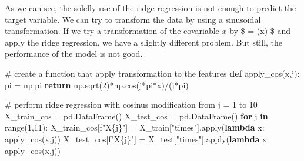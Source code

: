 \documentclass[
  letterpaper,
  DIV=11,
  numbers=noendperiod]{scrartcl}
\newenvironment{Shaded}{\begin{snugshade}}{\end{snugshade}}
\newcommand{\BuiltInTok}[1]{\textcolor[rgb]{0.00,0.23,0.31}{#1}}
\newcommand{\CommentTok}[1]{\textcolor[rgb]{0.37,0.37,0.37}{#1}}
\newcommand{\ControlFlowTok}[1]{\textcolor[rgb]{0.00,0.23,0.31}{\textbf{#1}}}
\newcommand{\DecValTok}[1]{\textcolor[rgb]{0.68,0.00,0.00}{#1}}
\newcommand{\KeywordTok}[1]{\textcolor[rgb]{0.00,0.23,0.31}{\textbf{#1}}}
\newcommand{\NormalTok}[1]{\textcolor[rgb]{0.00,0.23,0.31}{#1}}
\newcommand{\OperatorTok}[1]{\textcolor[rgb]{0.37,0.37,0.37}{#1}}
\newcommand{\SpecialCharTok}[1]{\textcolor[rgb]{0.37,0.37,0.37}{#1}}
\newcommand{\SpecialStringTok}[1]{\textcolor[rgb]{0.13,0.47,0.30}{#1}}
\newcommand{\StringTok}[1]{\textcolor[rgb]{0.13,0.47,0.30}{#1}}
\begin{document}
As we can see, the solelly use of the ridge regression is not enough to
predict the target variable. We can try to transform the data by using a
sinusoïdal transformation. If we try a transformation of the covariable
\(x\) by \$ = \cos(\pi x) \$ and apply the
ridge regression, we have a slightly different problem. But still, the
performance of the model is not good.

\begin{Shaded}
\begin{Highlighting}[]
\CommentTok{\# create a function that apply transformation to the features}
\KeywordTok{def}\NormalTok{ apply\_cos(x,j):}
\NormalTok{    pi }\OperatorTok{=}\NormalTok{ np.pi}
    \ControlFlowTok{return}\NormalTok{ np.sqrt(}\DecValTok{2}\NormalTok{)}\OperatorTok{*}\NormalTok{np.cos(j}\OperatorTok{*}\NormalTok{pi}\OperatorTok{*}\NormalTok{x)}\OperatorTok{/}\NormalTok{(j}\OperatorTok{*}\NormalTok{pi)}

\CommentTok{\# perform ridge regression with cosinus modification from j = 1 to 10}
\NormalTok{X\_train\_cos }\OperatorTok{=}\NormalTok{ pd.DataFrame()}
\NormalTok{X\_test\_cos }\OperatorTok{=}\NormalTok{ pd.DataFrame()}
\ControlFlowTok{for}\NormalTok{ j }\KeywordTok{in} \BuiltInTok{range}\NormalTok{(}\DecValTok{1}\NormalTok{,}\DecValTok{11}\NormalTok{):}
\NormalTok{    X\_train\_cos[}\SpecialStringTok{f"X}\SpecialCharTok{\{}\NormalTok{j}\SpecialCharTok{\}}\SpecialStringTok{"}\NormalTok{] }\OperatorTok{=}\NormalTok{ X\_train[}\StringTok{"times"}\NormalTok{].}\BuiltInTok{apply}\NormalTok{(}\KeywordTok{lambda}\NormalTok{ x: apply\_cos(x,j))}
\NormalTok{    X\_test\_cos[}\SpecialStringTok{f"X}\SpecialCharTok{\{}\NormalTok{j}\SpecialCharTok{\}}\SpecialStringTok{"}\NormalTok{] }\OperatorTok{=}\NormalTok{ X\_test[}\StringTok{"times"}\NormalTok{].}\BuiltInTok{apply}\NormalTok{(}\KeywordTok{lambda}\NormalTok{ x: apply\_cos(x,j))}
\end{Highlighting}
\end{Shaded}
\end{document}
